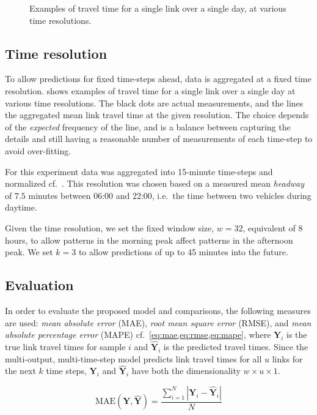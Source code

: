 ﻿\documentclass[preprint,11pt,5p,twocolumn]{elsarticle}
\newcommand{\matr}[1]{\mathbf{#1}}
\begin{document}
\begin{figure}[!t]
    \caption{Examples of travel time for a single link over a single day, at various time resolutions.}
    \label{fig:resolutions}
\end{figure}

\subsection{Time resolution}
To allow predictions for fixed time-steps ahead, data is aggregated at a fixed time resolution.  shows examples of travel time for a single link over a single day at various time resolutions. The black dots are actual measurements, and the lines the aggregated mean link travel time at the given resolution. The choice depends of the \emph{expected} frequency of the line, and is a balance between capturing the details and still having a reasonable number of measurements of each time-step to avoid over-fitting.

For this experiment data was aggregated into 15-minute time-steps and normalized cf.~. This resolution was chosen based on a measured mean \emph{headway} of $7.5$ minutes between 06:00 and 22:00, i.e.\ the time between two vehicles during daytime.

Given the time resolution, we set the fixed window size, $w = 32$, equivalent of 8 hours, to allow patterns in the morning peak affect patterns in the afternoon peak. We set $k = 3$ to allow predictions of up to 45 minutes into the future. 

\subsection{Evaluation}
In order to evaluate the proposed model and comparisons, the following measures are used: \emph{mean absolute error} (MAE), \emph{root mean square error} (RMSE), and \emph{mean absolute percentage error} (MAPE) cf.~\cref{eq:mae,eq:rmse,eq:mape}, where $\matr{Y}_i$ is the true link travel times for sample $i$ and $\matr{\widehat{Y}}_i$ is the predicted travel times. Since the multi-output, multi-time-step model predicts link travel times for all $u$ links for the next $k$ time steps, $\matr{Y}_i$ and $\matr{\widehat{Y}}_i$ have both the dimensionality $w \times u \times 1$.

\begin{equation}
    \textrm{MAE}(\matr{Y}, \matr{\widehat{Y}}) = \frac{\sum_{i = 1}^{N} \left| \matr{Y}_i - \matr{\widehat{Y}}_i \right| }{N}
    \label{eq:mae}
\end{equation}
\end{document}
